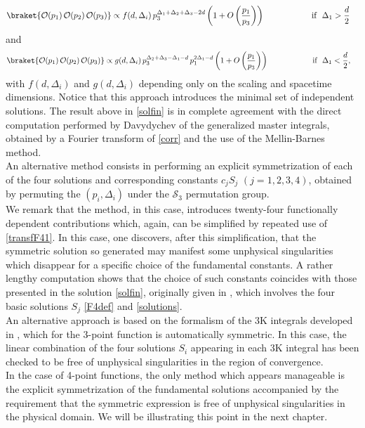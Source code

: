 \documentclass[a4paper,11pt,openright,twoside]{book}
\numberwithin{equation}{section}
\begin{document}
{	\begin{align}
		\braket{\mathcal{O}(p_1)\,\mathcal{O}(p_2)\,\mathcal{O}(p_3)}\propto f(d,\Delta_i)\,p_3^{\Delta_1+\Delta_2+\Delta_3-2d}\left( 1 +O\left(\frac{p_1}{p_3}\right)\right)  \hspace{2cm}\text{if}\ \ \Delta_1>\frac{d}{2}&
	\end{align}
	and
	\begin{align}
		\braket{\mathcal{O}(p_1)\,\mathcal{O}(p_2)\,\mathcal{O}(p_3)}\propto g(d,\Delta_i)\,p_3^{\Delta_2+\Delta_3-\Delta_1-d}\,p_1^{2\Delta_1-d}\left(1 +O\left(\frac{p_1}{p_3}\right)\right)\hspace{2cm} \text{if}\ \ \Delta_1<\frac{d}{2}&,
	\end{align}
	with $f(d,\Delta_i)$ and $g(d,\Delta_i)$ depending only on the scaling and spacetime dimensions. Notice that this approach introduces the minimal set of independent 
	solutions.  The result above in \eqref{solfin} is in complete agreement with the direct computation performed by Davydychev \cite{Davydychev:1992xr} of the generalized master integrals, obtained by a Fourier transform of \eqref{corr} and the use of the Mellin-Barnes method. \\
	An alternative method consists in performing an explicit symmetrization of each of the four solutions and corresponding constants $c_j S_j$ $(j=1,2,3,4)$, obtained by permuting the $(p_i,\Delta_i)$ under the $\mathcal{S}_3$ permutation group. \\
	We remark that the method, in this case, introduces twenty-four functionally dependent contributions which, again, can be simplified by repeated use of \eqref{transfF41}. In this case, one discovers, after this simplification, that the symmetric solution so generated may manifest some unphysical singularities which disappear for a specific choice of the fundamental constants. A rather lengthy computation shows that the choice of such constants coincides with those presented in the solution \eqref{solfin}, originally given in \cite{Coriano:2013jba}, which involves the four basic solutions $S_j$ \eqref{F4def} and \eqref{solutions}.\\
	An alternative approach is based on the formalism of the 3K integrals developed in \cite{Bzowski:2013sza,Bzowski:2015yxv}, which for the 3-point function is automatically symmetric. In this case, the linear combination of the four solutions $S_i$ appearing in each 3K integral has been checked to be free of unphysical singularities in the region of convergence.  \\
	In the case of 4-point functions, the only method which appears manageable is the explicit symmetrization of the fundamental solutions accompanied by the requirement that the symmetric expression is free of unphysical singularities in the physical domain. We will be illustrating this point in the next chapter.
}
\end{document}
